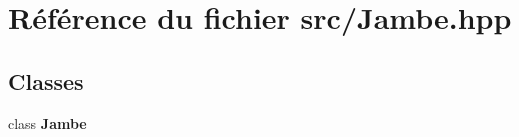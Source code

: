 \section{Référence du fichier src/\-Jambe.hpp}
\label{_jambe_8hpp}
\subsection*{Classes}
\begin{DoxyCompactItemize}
\item 
class {\bf Jambe}
\end{DoxyCompactItemize}
